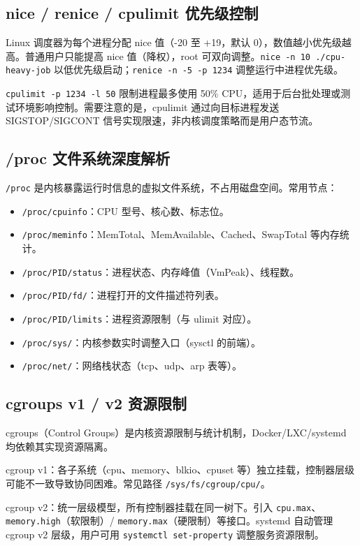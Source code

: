 \documentclass[12pt,UTF8]{ctexbook}
\begin{document}
    \subsection{nice / renice / cpulimit 优先级控制}

Linux 调度器为每个进程分配 nice 值（-20 至 +19，默认 0），数值越小优先级越高。普通用户只能提高 nice 值（降权），root 可双向调整。\verb|nice -n 10 ./cpu-heavy-job| 以低优先级启动；\verb|renice -n -5 -p 1234| 调整运行中进程优先级。

\verb|cpulimit -p 1234 -l 50| 限制进程最多使用 50\% CPU，适用于后台批处理或测试环境影响控制。需要注意的是，cpulimit 通过向目标进程发送 SIGSTOP/SIGCONT 信号实现限速，非内核调度策略而是用户态节流。

    \subsection{/proc 文件系统深度解析}

\verb|/proc| 是内核暴露运行时信息的虚拟文件系统，不占用磁盘空间。常用节点：
\begin{itemize}
	\item \verb|/proc/cpuinfo|：CPU 型号、核心数、标志位。
	\item \verb|/proc/meminfo|：MemTotal、MemAvailable、Cached、SwapTotal 等内存统计。
	\item \verb|/proc/PID/status|：进程状态、内存峰值（VmPeak）、线程数。
	\item \verb|/proc/PID/fd/|：进程打开的文件描述符列表。
	\item \verb|/proc/PID/limits|：进程资源限制（与 ulimit 对应）。
	\item \verb|/proc/sys/|：内核参数实时调整入口（sysctl 的前端）。
	\item \verb|/proc/net/|：网络栈状态（tcp、udp、arp 表等）。
\end{itemize}

    \subsection{cgroups v1 / v2 资源限制}

cgroups（Control Groups）是内核资源限制与统计机制，Docker/LXC/systemd 均依赖其实现资源隔离。

cgroup v1：各子系统（cpu、memory、blkio、cpuset 等）独立挂载，控制器层级可能不一致导致协同困难。常见路径 \verb|/sys/fs/cgroup/cpu/|。

cgroup v2：统一层级模型，所有控制器挂载在同一树下。引入 \verb|cpu.max|、\verb|memory.high|（软限制）/ \verb|memory.max|（硬限制）等接口。systemd 自动管理 cgroup v2 层级，用户可用 \verb|systemctl set-property| 调整服务资源限制。
\end{document}
